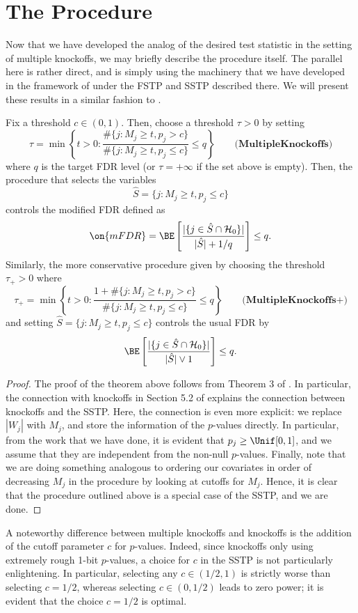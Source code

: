 \section{The Procedure}
Now that we have developed the analog of the desired test statistic in the setting of multiple knockoffs, we may briefly describe the procedure itself. The parallel here is rather direct, and is simply using the machinery that we have developed in the framework of \cite{knockoffs} under the FSTP and SSTP described there. We will present these results in a similar fashion to \cite{panning}.
\begin{theorem}
Fix a threshold $c \in (0,1)$. Then, choose a threshold $\tau > 0$ by setting
\[ \tau = \min \left\{ t > 0 : \frac{\# \{ j : M_j \geq t, p_j > c \}}{\# \{ j : M_j \geq t, p_j \leq c \}} \leq q \right\} \qquad \textbf{(MultipleKnockoffs)} \] where $q$ is the target FDR level (or $\tau = + \infty$ if the set above is empty). Then, the procedure that selects the variables
\[ \hat{S} = \{ j : M_j \geq t, p_j \leq c \} \] controls the modified FDR defined as
\[ \on{mFDR} = \BE\left[ \frac{|\{ j \in \hat{S} \cap \mathcal{H}_0 \}|}{|\hat{S}|+ 1 / q} \right] \leq q. \] Similarly, the more conservative procedure given by choosing the threshold $\tau_+ > 0$ where
\[ \tau_+ = \min \left\{ t > 0 : \frac{1 + \# \{ j : M_j \geq t, p_j > c \}}{\# \{ j : M_j \geq t, p_j \leq c \}} \leq q \right\} \qquad \textbf{(MultipleKnockoffs+)} \] and setting $\hat{S} = \{ j : M_j \geq t, p_j \leq c \}$ controls the usual FDR by
\[ \BE\left[ \frac{|\{ j \in \hat{S} \cap \mathcal{H}_0 \}|}{|\hat{S}| \vee 1} \right] \leq q. \]
\end{theorem}
\begin{proof}
The proof of the theorem above follows from Theorem 3 of \cite{knockoffs}. In particular, the connection with knockoffs in Section 5.2 of \cite{knockoffs} explains the connection between knockoffs and the SSTP. Here, the connection is even more explicit: we replace $|W_j|$ with $M_j$, and store the information of the $p$-values directly. In particular, from the work that we have done, it is evident that $p_j \geq \Unif[0,1]$, and we assume that they are independent from the non-null $p$-values. Finally, note that we are doing something analogous to ordering our covariates in order of decreasing $M_j$ in the procedure by looking at cutoffs for $M_j$. Hence, it is clear that the procedure outlined above is a special case of the SSTP, and we are done.
\end{proof}
A noteworthy difference between multiple knockoffs and knockoffs is the addition of the cutoff parameter $c$ for $p$-values. Indeed, since knockoffs only using extremely rough 1-bit $p$-values, a choice for $c$ in the SSTP is not particularly enlightening. In particular, selecting any $c \in (1/2, 1)$ is strictly worse than selecting $c = 1/2$, whereas selecting $c \in (0, 1/2)$ leads to zero power; it is evident that the choice $c = 1/2$ is optimal.

